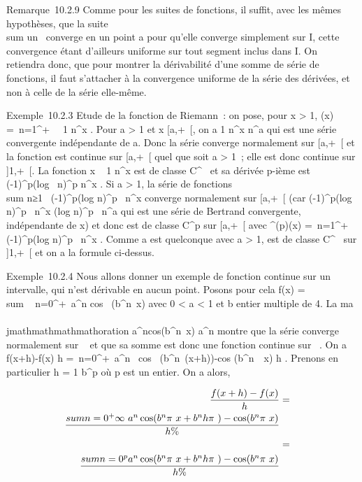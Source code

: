 Remarque~10.2.9 Comme pour les suites de fonctions, il suffit, avec les
mêmes hypothèses, que la suite
\\sum  un~
converge en un point a pour qu'elle converge simplement sur I, cette
convergence étant d'ailleurs uniforme sur tout segment inclus dans I. On
retiendra donc, que pour montrer la dérivabilité d'une somme de série de
fonctions, il faut s'attacher à la convergence uniforme de la série des
dérivées, et non à celle de la série elle-même.

Exemple~10.2.3 Etude de la fonction \zeta de Riemann~: on pose, pour x
\textgreater{} 1, \zeta(x) =\
\sum  n=1^+\infty~~ 1
\over n^x . Pour a \textgreater{} 1 et x \in
{[}a,+\infty~{[}, on a  1 \over n^x 
\over n^a qui est une série convergente
indépendante de a. Donc la série converge normalement sur {[}a,+\infty~{[} et
la fonction \zeta est continue sur {[}a,+\infty~{[} quel que soit a \textgreater{}
1~; elle est donc continue sur {]}1,+\infty~{[}. La fonction x \rightarrow~ 1
\over n^x est de classe C^\infty~ et sa
dérivée p-ième est  (-1)^p(log~
n)^p \over n^x . Si a
\textgreater{} 1, la série de fonctions
\\sum  n≥1~
(-1)^p(log n)^p~
\over n^x converge normalement sur
{[}a,+\infty~{[} (car \left \textbar{}
(-1)^p(log n)^p~
\over n^x \right
\textbar{}\leq (log n)^p~
\over n^a qui est une série de Bertrand
convergente, indépendante de x) et donc \zeta est de classe C^p
sur {[}a,+\infty~{[} avec \zeta^(p)(x) =\
\sum  n=1^+\infty~~
(-1)^p(log n)^p~
\over n^x . Comme a est quelconque avec a
\textgreater{} 1, \zeta est de classe C^\infty~ sur {]}1,+\infty~{[} et on a
la formule ci-dessus.

Exemple~10.2.4 Nous allons donner un exemple de fonction continue sur un
intervalle, qui n'est dérivable en aucun point. Posons pour cela f(x)
= \\sum ~
n=0^+\infty~a^n cos~
(b^n\pi~x) avec 0 \textless{} a \textless{} 1 et b entier
multiple de 4. La ma\\\\jmathmathmathmathoration \left
\textbar{}a^ncos(b^n\pi~x)\right
\textbar{} \leq a^n montre que la série converge normalement sur
~ et que sa somme est donc une fonction continue sur \mathbb{R}~. On a 
f(x+h)-f(x) \over h =\
\sum  n=0^+\infty~a^n~
cos~
(b^n\pi~(x+h))-cos (b^n~\pi~x)
\over h . Prenons en particulier h = 1
\over b^p où p est un entier. On a alors,

\begin{align*} f(x + h) - f(x)
\over h & =& \\sum
n=0^+\infty~a^n \cos
(b^n\pi~x + b^nh\pi~) - \cos
(b^n\pi~x) \over h \%&
\\ & =& \\sum
n=0^pa^n \cos
(b^n\pi~x + b^nh\pi~) - \cos
(b^n\pi~x) \over h \%&
\\ \end{align*}

